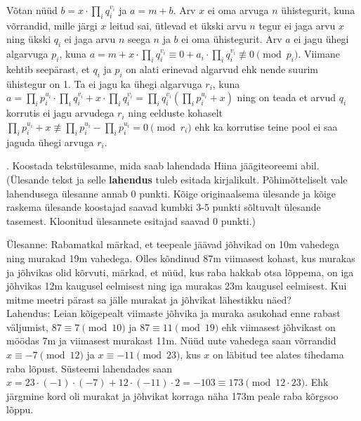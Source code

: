 \documentclass[a4paper, 10pt]{article}
\begin{document}
Võtan nüüd $b=x\cdot\prod_iq_i^{v_i}$ ja $a=m+b$. Arv $x$ ei oma arvuga $n$ ühistegurit, kuna võrrandid, mille järgi $x$ leitud sai, ütlevad et ükski arvu $n$ tegur ei jaga arvu $x$ ning ükski $q_i$ ei jaga arvu $n$ seega $n$ ja $b$ ei oma ühistegurit. Arv $a$ ei jagu ühegi algarvuga $p_i$, kuna $a= m+x\cdot\prod_iq_i^{v_i}\equiv 0+a_i\cdot\prod_iq_i^{v_i}\not\equiv0\pmod{p_i}$. Viimane kehtib seepärast, et $q_i$ ja $p_i$ on alati erinevad algarvud ehk nende suurim ühistegur on 1. Ta ei jagu ka ühegi algarvuga $r_i$, kuna $a=\prod_ip_i^{u_i}\cdot\prod_iq_i^{v_i}+x\cdot\prod_iq_i^{v_i}=\prod_iq_i^{v_i}(\prod_ip_i^{u_i}+x)$ ning on teada et arvud $q_i$ korrutis ei jagu arvudega $r_i$ ning eelduste kohaselt $\prod_ip_i^{u_i}+x\not\equiv\prod_ip_i^{u_i}-\prod_ip_i^{u_i}=0\pmod{r_i}$ ehk ka korrutise teine pool ei saa jaguda ühegi arvuga $r_i$.

\bigskip

. Koostada tekst\"ulesanne, mida saab lahendada Hiina \mbox{j\"a\"agiteoreemi} abil. \\(\"Ulesande tekst ja 
selle {\bf lahendus} tuleb esitada kirjalikult. Põhimõtteliselt vale lahendusega ülesanne annab 0 punkti. K\~oige originaalsema üles\-ande
ja kõige raskema \"ulesande koostajad saavad kumbki 3-5 punkti sõltuvalt ülesande tasemest. Kloonitud \"ulesannete 
esitajad saavad 0 punkti.)

\bigskip
Ülesanne: Rabamatkal märkad, et teepeale jäävad jõhvikad on 10m vahedega ning murakad 19m vahedega. Olles kõndinud 87m viimasest kohast, kus murakas ja jõhvikas olid kõrvuti, märkad, et nüüd, kus raba hakkab otsa lõppema, on iga jõhvikas 12m kaugusel eelmisest ning iga murakas 23m kaugusel eelmisest. Kui mitme meetri pärast sa jälle murakat ja jõhvikat lähestikku näed?\\

Lahendus: Leian kõigepealt viimaste jõhvika ja muraka asukohad enne rabast väljumist, $87\equiv7\pmod{10}$ ja $87\equiv11\pmod{19}$ ehk viimasest jõhvikast on möödas 7m ja viimasest murakast 11m. Nüüd uute vahedega saan võrrandid $x\equiv-7\pmod{12}$ ja $x\equiv-11\pmod{23}$, kus $x$ on läbitud tee alates tihedama raba lõpust. Süsteemi lahendades saan $x=23\cdot(-1)\cdot(-7)+12\cdot(-11)\cdot2=-103\equiv173\pmod{12\cdot23}$. Ehk järgmine kord oli murakat ja jõhvikat korraga näha 173m peale raba kõrgsoo lõppu.
\end{document}
